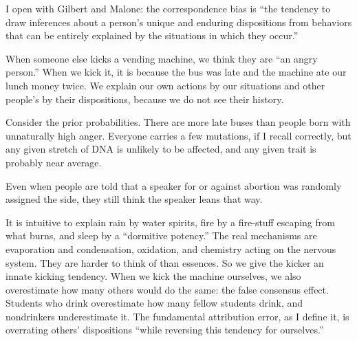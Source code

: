 
I open with Gilbert and Malone: the correspondence bias is ``the tendency to draw inferences about a person's unique and enduring dispositions from behaviors that can be entirely explained by the situations in which they occur.''

When someone else kicks a vending machine, we think they are ``an angry person.'' When we kick it, it is because the bus was late and the machine ate our lunch money twice. We explain our own actions by our situations and other people's by their dispositions, because we do not see their history. 

Consider the prior probabilities. There are more late buses than people born with unnaturally high anger.  Everyone carries a few mutations, if I recall correctly, but any given stretch of DNA is unlikely to be affected, and any given trait is probably near average.

Even when people are told that a speaker for or against abortion was randomly assigned the side, they still think the speaker leans that way. 

It is intuitive to explain rain by water spirits, fire by a fire-stuff escaping from what burns, and sleep by a ``dormitive potency.'' The real mechanisms are evaporation and condensation, oxidation, and chemistry acting on the nervous system. They are harder to think of than essences. So we give the kicker an innate kicking tendency.  When we kick the machine ourselves, we also overestimate how many others would do the same: the false consensus effect. Students who drink overestimate how many fellow students drink, and nondrinkers underestimate it. The fundamental attribution error, as I define it, is overrating others' dispositions ``while reversing this tendency for ourselves.'' 


